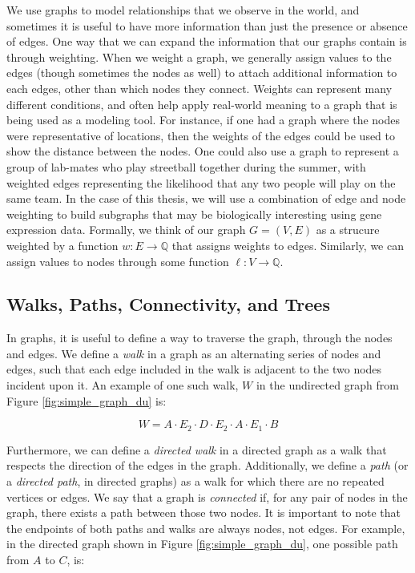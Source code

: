 \documentclass[12pt,twoside]{reedthesis}
\theoremstyle{definition}
\begin{document}
  We use graphs to model relationships that we observe in the world, and sometimes it is useful to have more information than just the presence or absence of edges. One way that we can expand the information that our graphs contain is through weighting. When we weight a graph, we generally assign values to the edges (though sometimes the nodes as well) to attach additional information to each edges, other than which nodes they connect. Weights can represent many different conditions, and often help apply real-world meaning to a graph that is being used as a modeling tool. For instance, if one had a graph where the nodes were representative of locations, then the weights of the edges could be used to show the distance between the nodes. One could also use a graph to represent a group of lab-mates who play streetball together during the summer, with weighted edges representing the likelihood that any two people will play on the same team. In the case of this thesis, we will use a combination of edge and node weighting to build subgraphs that may be biologically interesting using gene expression data. Formally, we think of our graph $G=(V,E)$ as a strucure weighted by a function $w:E \rightarrow \mathbb{Q}$ that assigns weights to edges. Similarly, we can assign values to nodes through some function $\ell:V \rightarrow \mathbb{Q}$.\par

   \subsection{Walks, Paths, Connectivity, and Trees}

   In graphs, it is useful to define a way to traverse the graph, through the nodes and edges. We define a \textit{walk} in a graph as an alternating series of nodes and edges, such that each edge included in the walk is adjacent to the two nodes incident upon it. An example of one such walk, $W$ in the undirected graph from Figure \ref{fig:simple_graph_du} is:\par

   \begin{equation*}
     W = A \cdot E_2 \cdot D \cdot E_2 \cdot A \cdot E_1 \cdot B
   \end{equation*}

   Furthermore, we can define a \textit{directed walk} in a directed graph as a walk that respects the direction of the edges in the graph. Additionally, we define a \textit{path} (or a \textit{directed path}, in directed graphs) as a walk for which there are no repeated vertices or edges. We say that a graph is \textit{connected} if, for any pair of nodes in the graph, there exists a path between those two nodes. It is important to note that the endpoints of both paths and walks are always nodes, not edges. For example, in the directed graph shown in Figure \ref{fig:simple_graph_du}, one possible path from $A$ to $C$, is:\par
\end{document}
